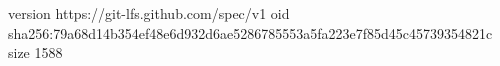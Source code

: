 version https://git-lfs.github.com/spec/v1
oid sha256:79a68d14b354ef48e6d932d6ae5286785553a5fa223e7f85d45c45739354821c
size 1588
